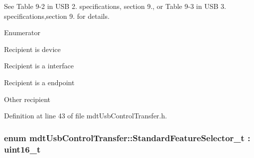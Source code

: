 See Table 9-\/2 in U\-S\-B 2. specifications, section 9., or Table 9-\/3 in U\-S\-B 3. specifications,section 9. for details. \begin{Desc}
\item[Enumerator]\par
\begin{description}
\item[{\em 
\hypertarget{classmdt_usb_control_transfer_a372afc0db22a4ec839bab18cfbed35c5ae0ac20adce6ffee48c7151b070aa5737}{Device}\label{classmdt_usb_control_transfer_a372afc0db22a4ec839bab18cfbed35c5ae0ac20adce6ffee48c7151b070aa5737}
}]Recipient is device \item[{\em 
\hypertarget{classmdt_usb_control_transfer_a372afc0db22a4ec839bab18cfbed35c5a3c1aac82863ed9e5a9aca8ce687f711d}{Interface}\label{classmdt_usb_control_transfer_a372afc0db22a4ec839bab18cfbed35c5a3c1aac82863ed9e5a9aca8ce687f711d}
}]Recipient is a interface \item[{\em 
\hypertarget{classmdt_usb_control_transfer_a372afc0db22a4ec839bab18cfbed35c5a2a6ba72e93aa7fa676d07973ed2716bb}{Endpoint}\label{classmdt_usb_control_transfer_a372afc0db22a4ec839bab18cfbed35c5a2a6ba72e93aa7fa676d07973ed2716bb}
}]Recipient is a endpoint \item[{\em 
\hypertarget{classmdt_usb_control_transfer_a372afc0db22a4ec839bab18cfbed35c5a6311ae17c1ee52b36e68aaf4ad066387}{Other}\label{classmdt_usb_control_transfer_a372afc0db22a4ec839bab18cfbed35c5a6311ae17c1ee52b36e68aaf4ad066387}
}]Other recipient \end{description}
\end{Desc}


Definition at line 43 of file mdt\-Usb\-Control\-Transfer.\-h.

\hypertarget{classmdt_usb_control_transfer_acae7a9c10825dd7fa7695a16986a2f36}{
\subsubsection[{Standard\-Feature\-Selector\-\_\-t}]{\setlength{\rightskip}{0pt plus 5cm}enum {\bf mdt\-Usb\-Control\-Transfer\-::\-Standard\-Feature\-Selector\-\_\-t} \-: uint16\-\_\-t\hspace{0.3cm}{\ttfamily [strong]}}}\label{classmdt_usb_control_transfer_acae7a9c10825dd7fa7695a16986a2f36}


